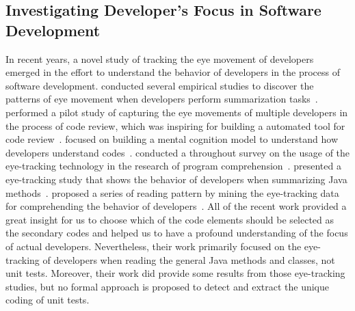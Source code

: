 \subsection{Investigating Developer's Focus in Software Development}

In recent years, a novel study of tracking the eye movement of developers emerged in the effort to understand the behavior of developers in the process of software development.
%
\citeauthor{rodeghero2015empirical} conducted several empirical studies to discover the patterns of eye movement when developers perform summarization tasks~\cite{rodeghero2015eye,rodeghero2015empirical,rodeghero2014improving}.
%
\citeauthor{begel2018eye} performed a pilot study of capturing the eye movements of multiple developers in the process of code review, which was inspiring for building a automated tool for code review~\cite{begel2018eye}.
%
\citeauthor{abid2019using} focused on building a mental cognition model to understand how developers understand codes~\cite{abid2019using}.
%
\citeauthor{obaidellah2018survey} conducted a throughout survey on the usage of the eye-tracking technology in the research of program comprehension~\cite{obaidellah2018survey}.
%
\citeauthor{abid2019developer} presented a eye-tracking study that shows the behavior of developers when summarizing Java methods~\cite{abid2019developer}.
%
\citeauthor{ioannou2020mining} proposed a series of reading pattern by mining the eye-tracking data for comprehending the behavior of developers~\cite{ioannou2020mining}.
%
All of the recent work provided a great insight for us to choose which of the code elements should be selected as the secondary codes and helped us to have a profound understanding of the focus of actual developers.
%
Nevertheless, their work primarily focused on the eye-tracking of developers when reading the general Java methods and classes, not unit tests.
%
Moreover, their work did provide some results from those eye-tracking studies, but no formal approach is proposed to detect and extract the unique coding of unit tests.

